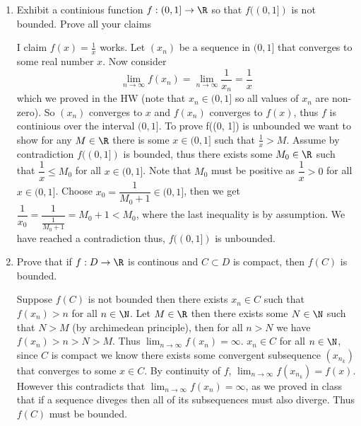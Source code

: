 \documentclass[11pt]{exam}
\begin{document}
\begin{enumerate}
\begin{solution}
            \end{solution}
        \item Exhibit a continious function $f: (0, 1] \to \R$ so that $f((0, 1])$ is not bounded. Prove all your claims
            \begin{solution}
                I claim $f(x) = \frac{1}{x}$ works. Let $(x_n)$ be a sequence in $(0, 1]$ that converges to some real number $x$. Now consider $$\lim_{n \to \infty} f(x_n) = \lim_{n \to \infty} \frac{1}{x_n} = \frac{1}{x}$$
                which we proved in the HW (note that $x_n \in (0, 1]$ so all values of $x_n$ are non-zero). So $(x_n)$ converges to $x$ and $f(x_n)$ converges to $f(x)$, thus $f$ is continious over the interval $(0, 1]$. To prove f((0, 1]) is unbounded we want to show for any $M \in \R$ there is some $x \in (0, 1]$ such that $\frac{1}{x} > M$. Assume by contradiction $f((0, 1])$ is bounded, thus there exists some $M_0 \in \R$ such that  $\dfrac{1}{x} \leq M_0$ for all $x \in (0, 1]$. Note that $M_0$ must be positive as $\dfrac{1}{x} > 0$ for all $x \in (0, 1]$. Choose $x_0 = \dfrac{1}{M_0 + 1} \in (0, 1]$, then we get $\dfrac{1}{x_0} = \dfrac{1}{\frac{1}{M_0 + 1}} = M_0 + 1 < M_0$, where the last inequality is by assumption. We have reached a contradiction thus, $f((0, 1])$ is unbounded. 
            \end{solution}
        \item Prove that if $f: D \to \R$ is continous and $C \subset D$ is compact, then $f(C)$ is bounded.
            \begin{solution}
                Suppose $f(C)$ is not bounded then there exists $x_n \in C$ such that $f(x_n) > n$ for all $n \in \N$. Let $M \in \R$ then there exists some $N \in \N$ such that $N > M$ (by archimedean principle), then for all $n > N$ we have $f(x_n) > n > N > M$. Thus $\lim_{n \to \infty} f(x_n) = \infty$. $x_n \in C$ for all $n \in \N$, since $C$ is compact we know there exists some convergent subsequence $(x_{n_k})$ that converges to some $x \in C$. By continuity of $f$, $\lim_{n \to \infty} f(x_{n_k}) = f(x)$. However this contradicts that $\lim_{n \to \infty} f(x_n) = \infty$, as we proved in class that if a sequence diveges then all of its subsequences must also diverge. Thus $f(C)$ must be bounded.
            \end{solution}
    \end{enumerate}
\end{document}
